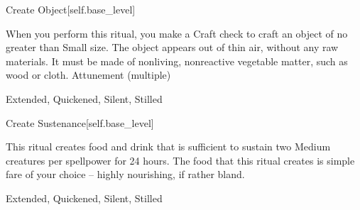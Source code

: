 \begin{spellsection}{Create Object}[self.base_level]
\begin{spellcontent}
\begin{spelltargetinginfo}
\spellrng{\rngclose}
\end{spelltargetinginfo}
\begin{spelleffects}
\spelleffect
When you perform this ritual, you make a Craft check to craft an object of no greater than Small size.
The object appears out of thin air, without any raw materials.
It must be made of nonliving, nonreactive vegetable matter, such as wood or cloth.
\spelldur Attunement (multiple)
\end{spelleffects}
\end{spellcontent}
\begin{spellfooter}
 Extended, Quickened, Silent, Stilled
\end{spellfooter}
\begin{spellsubcontent}
\end{spellsubcontent}
\end{spellsection}
\begin{spellsection}{Create Sustenance}[self.base_level]
\begin{spellcontent}
\begin{spelltargetinginfo}
\spellrng{\rngclose}
\end{spelltargetinginfo}
\begin{spelleffects}
\spelleffect
This ritual creates food and drink that is sufficient to sustain two Medium creatures per spellpower for 24 hours.
The food that this ritual creates is simple fare of your choice -- highly nourishing, if rather bland.
\end{spelleffects}
\end{spellcontent}
\begin{spellfooter}
 Extended, Quickened, Silent, Stilled
\end{spellfooter}
\begin{spellsubcontent}
\end{spellsubcontent}
\end{spellsection}
